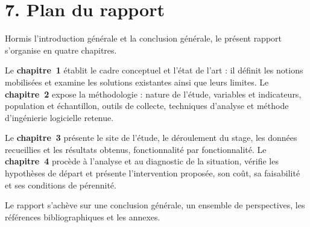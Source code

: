 \section*{7. Plan du rapport}

Hormis l'introduction générale et la conclusion générale, le présent rapport
s'organise en quatre chapitres.

Le \textbf{chapitre~1} établit le cadre conceptuel et l'état de l'art : il
définit les notions mobilisées et examine les solutions existantes ainsi que
leurs limites. Le \textbf{chapitre~2} expose la méthodologie : nature de
l'étude, variables et indicateurs, population et échantillon, outils de
collecte, techniques d'analyse et méthode d'ingénierie logicielle retenue.

Le \textbf{chapitre~3} présente le site de l'étude, le déroulement du stage, les
données recueillies et les résultats obtenus, fonctionnalité par fonctionnalité.
Le \textbf{chapitre~4} procède à l'analyse et au diagnostic de la situation,
vérifie les hypothèses de départ et présente l'intervention proposée, son coût,
sa faisabilité et ses conditions de pérennité.

Le rapport s'achève sur une conclusion générale, un ensemble de perspectives,
les références bibliographiques et les annexes.
